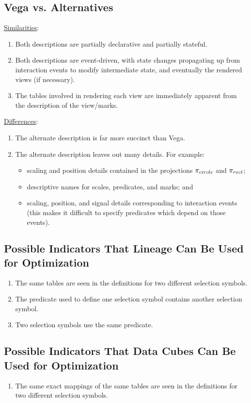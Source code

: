 \subsection{Vega vs. Alternatives}
\underline{Similarities}:
\begin{enumerate}
	\item Both descriptions are partially declarative and partially stateful.
	\item Both descriptions are event-driven, with state changes propagating up from interaction events to modify intermediate state, and eventually the rendered views (if necessary).
	\item The tables involved in rendering each view are immediately apparent from the description of the view/marks.
\end{enumerate}
\underline{Differences}:
\begin{enumerate}
	\item The alternate description is far more succinct than Vega.
	\item The alternate description leaves out many details.
		For example:
		\begin{itemize}
			\item scaling and position details contained in the projections $\mathlarger{\pi}_{circle}$ and $\mathlarger{\pi}_{rect}$;
			\item descriptive names for scales, predicates, and marks; and
			\item scaling, position, and signal details corresponding to interaction events (this makes it difficult to specify predicates which depend on those events).
		\end{itemize}
\end{enumerate}
\subsection{Possible Indicators That Lineage Can Be Used for Optimization}
\begin{enumerate}
	\item The same tables are seen in the definitions for two different selection symbols.
	\item The predicate used to define one selection symbol contains another selection symbol.
	\item Two selection symbols use the same predicate.
\end{enumerate}
\subsection{Possible Indicators That Data Cubes Can Be Used for Optimization}
\begin{enumerate}
	\item The same exact mappings of the same tables are seen in the definitions for two different selection symbols.
\end{enumerate}
